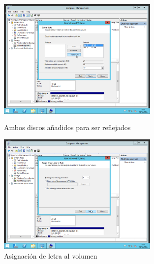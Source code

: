 \begin{figure}[H]
	\begin{center}
		\includegraphics[width=0.7\textwidth]{Imagenes/05_Estado-final-al-anadir-volumenes-reflejados}
		\caption{Ambos discos añadidos para ser reflejados} \label{fig:figura15}
		
		\includegraphics[width=0.7\textwidth]{Imagenes/06_Asignacion-de-letra-al-volumen-final.png}
		\caption{Asignación de letra al volumen} \label{fig:figura16}
	\end{center}
\end{figure}

